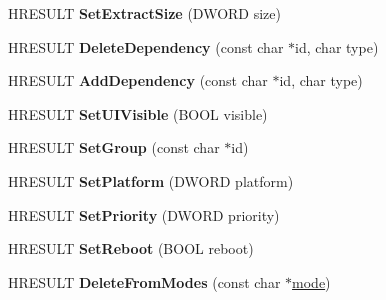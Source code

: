 \begin{DoxyCompactItemize}
\item 
\mbox{\label{interface_i_cif_r_w_component_a8d8d29c9deb06131201693a636a093dd}} 
H\+R\+E\+S\+U\+LT {\bfseries Set\+Extract\+Size} (D\+W\+O\+RD size)
\item 
\mbox{\label{interface_i_cif_r_w_component_a6cbf6cf9e9123e56a1d35b5a56c98c90}} 
H\+R\+E\+S\+U\+LT {\bfseries Delete\+Dependency} (const char $\ast$id, char type)
\item 
\mbox{\label{interface_i_cif_r_w_component_ae909bb9605f15bc4401d4b72dfb404e3}} 
H\+R\+E\+S\+U\+LT {\bfseries Add\+Dependency} (const char $\ast$id, char type)
\item 
\mbox{\label{interface_i_cif_r_w_component_a6595d6775a5cbc1515931055b6b40493}} 
H\+R\+E\+S\+U\+LT {\bfseries Set\+U\+I\+Visible} (B\+O\+OL visible)
\item 
\mbox{\label{interface_i_cif_r_w_component_af9454d2dfdc2f453601d538d8dd568c8}} 
H\+R\+E\+S\+U\+LT {\bfseries Set\+Group} (const char $\ast$id)
\item 
\mbox{\label{interface_i_cif_r_w_component_ad77048629d32c664ff32c5d2f51308c4}} 
H\+R\+E\+S\+U\+LT {\bfseries Set\+Platform} (D\+W\+O\+RD platform)
\item 
\mbox{\label{interface_i_cif_r_w_component_a9866cc9d6a0aae601be481816737c112}} 
H\+R\+E\+S\+U\+LT {\bfseries Set\+Priority} (D\+W\+O\+RD priority)
\item 
\mbox{\label{interface_i_cif_r_w_component_afa789dade9d70e0e374867c5cfa3ac34}} 
H\+R\+E\+S\+U\+LT {\bfseries Set\+Reboot} (B\+O\+OL reboot)
\item 
\mbox{\label{interface_i_cif_r_w_component_aa2e2d5b2be990c08fba568af50a49ebd}} 
H\+R\+E\+S\+U\+LT {\bfseries Delete\+From\+Modes} (const char $\ast$\hyperlink{interfacevoid}{mode})
\item 
\mbox{\label{interface_i_cif_r_w_component_ae7ef4aa054cd3c43851299b0230e54fe}} 

\end{DoxyCompactItemize}
